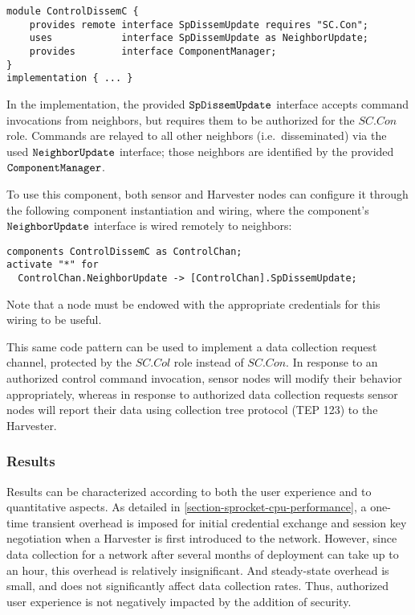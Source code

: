 \singlespace
\begin{lstlisting}[language=nesC]
module ControlDissemC {
    provides remote interface SpDissemUpdate requires "SC.Con";
    uses            interface SpDissemUpdate as NeighborUpdate;
    provides        interface ComponentManager;
}
implementation { ... }
\end{lstlisting}
\primaryspacing

In the implementation, the provided $\verb+SpDissemUpdate+$ interface accepts command
invocations from neighbors, but requires them to be authorized for the $\mathit{SC.Con}$ role.
Commands are relayed to all other neighbors (i.e.~disseminated) via the used
$\verb+NeighborUpdate+$ interface; those neighbors are identified by the provided
$\verb+ComponentManager+$.

To use this component, both sensor and Harvester nodes can configure it through the following
component instantiation and wiring, where the component's $\verb+NeighborUpdate+$ interface is
wired remotely to neighbors:

\singlespace
\begin{lstlisting}[language=nesC]
components ControlDissemC as ControlChan;
activate "*" for 
  ControlChan.NeighborUpdate -> [ControlChan].SpDissemUpdate;
\end{lstlisting}
\primaryspacing
Note that a node must be endowed with the appropriate credentials for this wiring to be useful.

This same code pattern can be used to implement a data collection request channel, protected by
the $\mathit{SC.Col}$ role instead of $\mathit{SC.Con}$. In response to an authorized control
command invocation, sensor nodes will modify their behavior appropriately, whereas in response
to authorized data collection requests sensor nodes will report their data using collection tree
protocol (TEP 123) to the Harvester.

\subsubsection{Results}

Results can be characterized according to both the user experience and to quantitative aspects.
As detailed in \autoref{section-sprocket-cpu-performance}, a one-time transient overhead is
imposed for initial credential exchange and session key negotiation when a Harvester is first
introduced to the network. However, since data collection for a network after several months of
deployment can take up to an hour, this overhead is relatively insignificant. And steady-state
overhead is small, and does not significantly affect data collection rates. Thus, authorized
user experience is not negatively impacted by the addition of security.

